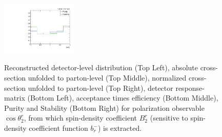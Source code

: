 \begin{figure}[htb]
\begin{center}
 \includegraphics[width=0.32\textwidth]{fig_fullRun2UL/unfolding/combined/PurStab_b2r.pdf} \\
\caption{Reconstructed detector-level distribution (Top Left), absolute cross-section unfolded to parton-level (Top Middle), normalized cross-section unfolded to parton-level (Top Right), detector response-matrix (Bottom Left), acceptance times efficiency (Bottom Middle), Purity and Stability (Bottom Right) for polarization observable $\cos\theta_{2}^{r}$, from which spin-density coefficient $B_{2}^{r}$ (sensitive to spin-density coefficient function $b_r^{-}$) is extracted.}
\label{fig:b2r}
\end{center}
\end{figure}
\clearpage
